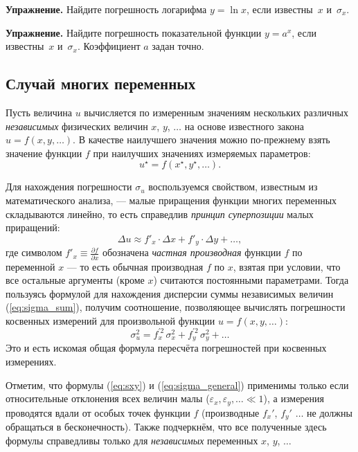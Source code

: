 \documentclass[10pt]{article}
\begin{document}
{\footnotesize
\textbf{Упражнение.} Найдите погрешность
логарифма $y=\ln x$, если известны~$x$ и~$\sigma_{x}$.\par
}%

{\footnotesize
\textbf{Упражнение.} Найдите погрешность
показательной функции $y=a^{x}$, если известны~$x$ и~$\sigma_{x}$.
Коэффициент $a$ задан точно.\par
}%

\subsection{Случай многих переменных}

Пусть величина $u$ вычисляется по измеренным значениям нескольких
различных \emph{независимых} физических величин $x$, $y$, $\ldots$
на основе известного закона $u=f\!\left(x,y,\ldots\right)$. В качестве
наилучшего значения можно по-прежнему взять значение функции $f$
при наилучших значениях измеряемых параметров:
\[
u^{\star}=f\!\left(x^{\star},y^{\star},\ldots\right).
\]

Для нахождения погрешности $\sigma_{u}$ воспользуемся свойством,
известным из математического анализа, --- малые приращения
функции многих переменных складываются линейно, то есть справедлив
\emph{принцип суперпозиции} малых приращений:
\[
\Delta u\approx f'_{x}\cdot\Delta x+f'_{y}\cdot\Delta y+\ldots,
\]
где символом $f'_{x}\equiv\frac{\partial f}{\partial x}$ обозначена
\emph{частная производная} функции $f$ по переменной $x$ ---
то есть обычная производная $f$ по $x$, взятая при условии, что
все остальные аргументы (кроме $x$) считаются постоянными параметрами.
Тогда пользуясь формулой для нахождения дисперсии суммы независимых
величин (\ref{eq:sigma_sum}), получим соотношение, позволяющее вычислять
погрешности косвенных измерений для произвольной функции $u=f\left(x,y,\ldots\right)$:
\begin{equation}
\boxed{\sigma_{u}^{2}=f_{x}^{\prime2}\,\sigma_{x}^{2}+f_{y}^{\prime2}\,\sigma_{y}^{2}+\ldots}\label{eq:sigma_general}
\end{equation}
Это и есть искомая общая формула пересчёта погрешностей при косвенных
измерениях.

Отметим, что формулы (\ref{eq:sxy}) и (\ref{eq:sigma_general}) применимы
только если относительные отклонения всех величин малы ($\varepsilon_{x},\varepsilon_{y},\ldots\ll1$),
а измерения проводятся вдали от особых точек функции $f$ (производные
$f_{x}'$, $f_{y}'$ $\ldots$ не должны обращаться в бесконечность).
Также подчеркнём, что все полученные здесь формулы справедливы только
для \emph{независимых} переменных $x$, $y$, $\ldots$
\end{document}
